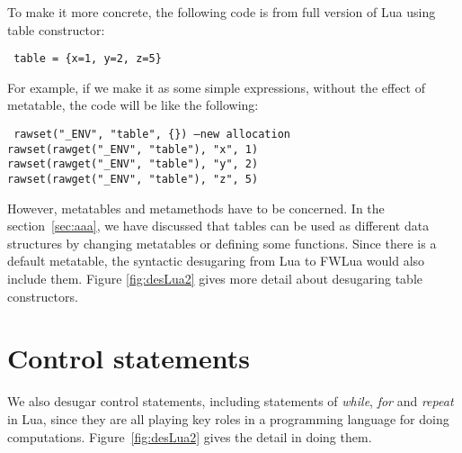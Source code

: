 To make it more concrete, the following code is from full version of Lua using table constructor:
\begin{flushleft}
{\tt
table = \{x=1, y=2, z=5\}\\
}
\end{flushleft}
For example, if we make it as some simple expressions, without the effect of metatable, the code will be like the following:
\begin{flushleft}
{\tt
rawset("\_ENV", "table", \{\}) ---new allocation\\
rawset(rawget("\_ENV", "table"), "x", 1)\\
rawset(rawget("\_ENV", "table"), "y", 2)\\
rawset(rawget("\_ENV", "table"), "z", 5)\\
}
\end{flushleft}

However, metatables and metamethods have to be concerned. In the section~\ref{sec:aaa}, we have discussed that tables can be used as different data structures by changing metatables or defining some functions. Since there is a default metatable, the syntactic desugaring from Lua to FWLua would also include them. Figure \ref{fig:desLua2} gives more detail about desugaring table constructors.

\section{Control statements}
We also desugar control statements, including statements of {\it while}, {\it for} and {\it repeat} in Lua, since they are all playing key roles in a programming language for doing computations. Figure~\ref{fig:desLua2} gives the detail in doing them.

